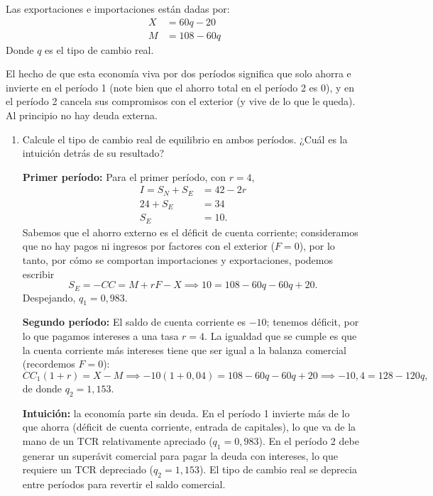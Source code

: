 \documentclass[a4paper]{article}
\begin{document}
Las exportaciones e importaciones están dadas por:
\begin{align*}
X &= 60q - 20 \\
M &= 108 - 60q
\end{align*}
Donde $q$ es el tipo de cambio real.

El hecho de que esta economía viva por dos períodos significa que solo ahorra e invierte en el período 1 (note bien que el ahorro total en el período 2 es 0), y en el período 2 cancela sus compromisos con el exterior (y vive de lo que le queda). Al principio no hay deuda externa.

\begin{enumerate}
  \item[a)] Calcule el tipo de cambio real de equilibrio en ambos períodos. ¿Cuál es la intuición detrás de su resultado?
  \begin{solution}
      \textbf{Primer período:} Para el primer período, con $r = 4$,
      \begin{align*}
          I = S_N + S_E &= 42 - 2r \\
          24 + S_E &= 34 \\
          S_E &= 10.
      \end{align*}
      Sabemos que el ahorro externo es el déficit de cuenta corriente; consideramos que no hay pagos ni ingresos por factores con el exterior ($F = 0$), por lo tanto, por cómo se comportan importaciones y exportaciones, podemos escribir $$S_E = -CC = M + rF - X \implies 10 = 108 - 60q - 60q + 20.$$ Despejando, $q_1 = 0{,}983$.

      \textbf{Segundo período:} El saldo de cuenta corriente es $-10$; tenemos déficit, por lo que pagamos intereses a una tasa $r = 4$. La igualdad que se cumple es que la cuenta corriente más intereses tiene que ser igual a la balanza comercial (recordemos $F = 0$):
      \[
      CC_1(1+r) = X - M \implies -10(1+0{,}04) = 108 - 60q - 60q + 20 \implies -10{,}4 = 128 - 120q,
      \]
      de donde $q_2 = 1{,}153$.

      \textbf{Intuición:} la economía parte sin deuda. En el período 1 invierte más de lo que ahorra (déficit de cuenta corriente, entrada de capitales), lo que va de la mano de un TCR relativamente apreciado ($q_1 = 0{,}983$). En el período 2 debe generar un superávit comercial para pagar la deuda con intereses, lo que requiere un TCR depreciado ($q_2 = 1{,}153$). El tipo de cambio real se deprecia entre períodos para revertir el saldo comercial.
  \end{solution}


\end{enumerate}
\end{document}
